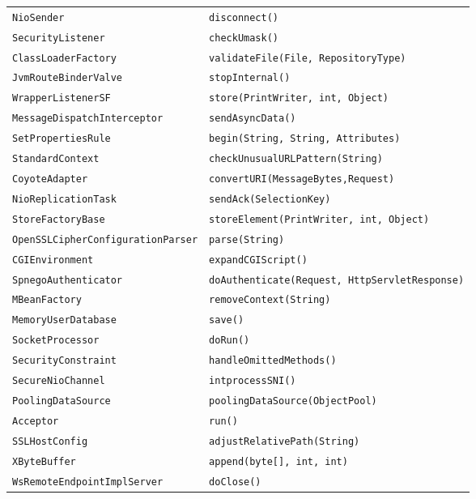 \begin{center}
\begin{longtable}{ll}
 \lstinline/NioSender/&{\lstinline/disconnect()/}\\
 \lstinline/SecurityListener/&{\lstinline/checkUmask()/}\\
 \lstinline/ClassLoaderFactory/&{\lstinline/validateFile(File, RepositoryType)/}\\
 \lstinline/JvmRouteBinderValve/&{\lstinline/stopInternal()/}\\
 \lstinline/WrapperListenerSF/&{\lstinline/store(PrintWriter, int, Object)/}\\
 \lstinline/MessageDispatchInterceptor/&{\lstinline/sendAsyncData()/}\\
 \lstinline/SetPropertiesRule/&{\lstinline/begin(String, String, Attributes)/}\\
 \lstinline/StandardContext/&{\lstinline/checkUnusualURLPattern(String)/}\\
 \lstinline/CoyoteAdapter/&{\lstinline/convertURI(MessageBytes,Request)/}\\
 \lstinline/NioReplicationTask/&{\lstinline/sendAck(SelectionKey)/}\\
 \lstinline/StoreFactoryBase/&{\lstinline/storeElement(PrintWriter, int, Object)/}\\
 \lstinline/OpenSSLCipherConfigurationParser/&{\lstinline/parse(String)/}\\
 \lstinline/CGIEnvironment/&{\lstinline/expandCGIScript()/}\\
 \lstinline/SpnegoAuthenticator/&{\lstinline/doAuthenticate(Request, HttpServletResponse)/}\\
 \lstinline/MBeanFactory/&{\lstinline/removeContext(String)/}\\
 \lstinline/MemoryUserDatabase/&{\lstinline/save()/}\\
 \lstinline/SocketProcessor/&{\lstinline/doRun()/}\\
 \lstinline/SecurityConstraint/&{\lstinline/handleOmittedMethods()/}\\
 \lstinline/SecureNioChannel/&{\lstinline/intprocessSNI()/}\\
 \lstinline/PoolingDataSource/&{\lstinline/poolingDataSource(ObjectPool)/}\\
 \lstinline/Acceptor/&{\lstinline/run()/}\\
 \lstinline/SSLHostConfig/&{\lstinline/adjustRelativePath(String)/}\\
 \lstinline/XByteBuffer/&{\lstinline/append(byte[], int, int)/}\\
 \lstinline/WsRemoteEndpointImplServer/&{\lstinline/doClose()/}\\

\end{longtable}
\end{center}
